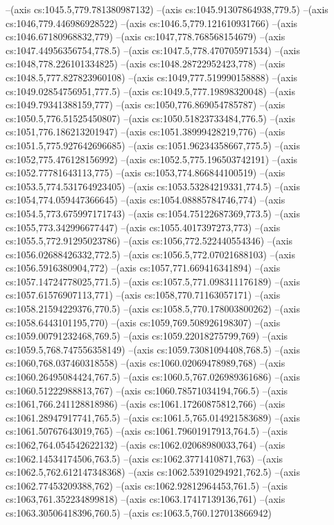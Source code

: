 --(axis cs:1045.5,779.781380987132)
--(axis cs:1045.91307864938,779.5)
--(axis cs:1046,779.446986928522)
--(axis cs:1046.5,779.121610931766)
--(axis cs:1046.67180968832,779)
--(axis cs:1047,778.768568154679)
--(axis cs:1047.44956356754,778.5)
--(axis cs:1047.5,778.470705971534)
--(axis cs:1048,778.226101334825)
--(axis cs:1048.28722952423,778)
--(axis cs:1048.5,777.827823960108)
--(axis cs:1049,777.519990158888)
--(axis cs:1049.02854756951,777.5)
--(axis cs:1049.5,777.19898320048)
--(axis cs:1049.79341388159,777)
--(axis cs:1050,776.869054785787)
--(axis cs:1050.5,776.51525450807)
--(axis cs:1050.51823733484,776.5)
--(axis cs:1051,776.186213201947)
--(axis cs:1051.38999428219,776)
--(axis cs:1051.5,775.927642696685)
--(axis cs:1051.96234358667,775.5)
--(axis cs:1052,775.476128156992)
--(axis cs:1052.5,775.196503742191)
--(axis cs:1052.77781643113,775)
--(axis cs:1053,774.866844100519)
--(axis cs:1053.5,774.531764923405)
--(axis cs:1053.53284219331,774.5)
--(axis cs:1054,774.059447366645)
--(axis cs:1054.08885784746,774)
--(axis cs:1054.5,773.675997171743)
--(axis cs:1054.75122687369,773.5)
--(axis cs:1055,773.342996677447)
--(axis cs:1055.4017397273,773)
--(axis cs:1055.5,772.91295023786)
--(axis cs:1056,772.522440554346)
--(axis cs:1056.02688426332,772.5)
--(axis cs:1056.5,772.07021688103)
--(axis cs:1056.5916380904,772)
--(axis cs:1057,771.669416341894)
--(axis cs:1057.14724778025,771.5)
--(axis cs:1057.5,771.098311176189)
--(axis cs:1057.61576907113,771)
--(axis cs:1058,770.71163057171)
--(axis cs:1058.21594229376,770.5)
--(axis cs:1058.5,770.178003800262)
--(axis cs:1058.6443101195,770)
--(axis cs:1059,769.508926198307)
--(axis cs:1059.00791232468,769.5)
--(axis cs:1059.22018275799,769)
--(axis cs:1059.5,768.747556358149)
--(axis cs:1059.73081094408,768.5)
--(axis cs:1060,768.037460318558)
--(axis cs:1060.02069478989,768)
--(axis cs:1060.26495084424,767.5)
--(axis cs:1060.5,767.026989361686)
--(axis cs:1060.51222988813,767)
--(axis cs:1060.78571034194,766.5)
--(axis cs:1061,766.241128818986)
--(axis cs:1061.17260875812,766)
--(axis cs:1061.28947917741,765.5)
--(axis cs:1061.5,765.014921583689)
--(axis cs:1061.50767643019,765)
--(axis cs:1061.79601917913,764.5)
--(axis cs:1062,764.054542622132)
--(axis cs:1062.02068980033,764)
--(axis cs:1062.14534174506,763.5)
--(axis cs:1062.3771410871,763)
--(axis cs:1062.5,762.612147348368)
--(axis cs:1062.53910294921,762.5)
--(axis cs:1062.77453209388,762)
--(axis cs:1062.92812964453,761.5)
--(axis cs:1063,761.352234899818)
--(axis cs:1063.17417139136,761)
--(axis cs:1063.30506418396,760.5)
--(axis cs:1063.5,760.127013866942)
